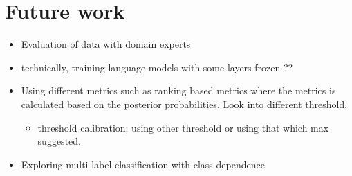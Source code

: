 \section{Future work}
\begin{itemize}
    \item Evaluation of data with domain experts
    \item technically, training language models with some layers frozen ??
    \item Using different metrics such as ranking based metrics where the metrics is calculated based on the posterior probabilities. Look into different threshold.
        \begin{itemize}
            \item threshold calibration; using other threshold or using that which max suggested. 
        \end{itemize}
    \item Exploring multi label classification with class dependence
\end{itemize}